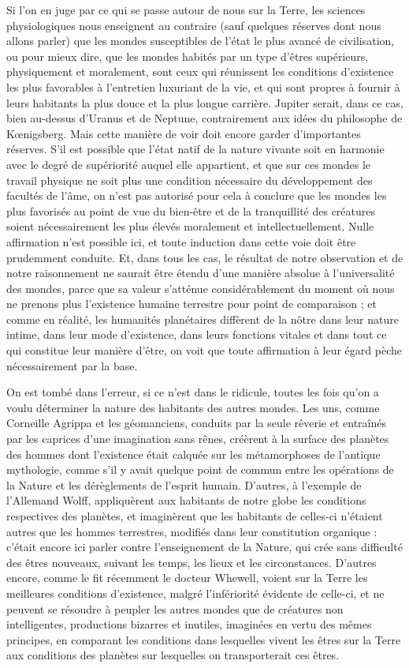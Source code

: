\documentclass[a4paper, 11pt, oneside, landscape]{article}
\begin{document}
Si l'on en juge par ce qui se passe autour de nous sur la Terre, les sciences physiologiques nous enseignent au contraire (sauf quelques réserves dont nous allons parler) que les mondes susceptibles de l'état le plus avancé de civilisation, ou pour mieux dire, que les mondes habités par un type d'êtres supérieurs, physiquement et moralement, sont ceux qui réunissent les conditions d'existence les plus favorables à l'entretien luxuriant de la vie, et qui sont propres à fournir à leurs habitants la plus douce et la plus longue carrière. Jupiter serait, dans ce cas, bien au-dessus d'Uranus et de Neptune, contrairement aux idées du philosophe de Kœnigsberg. Mais cette manière de voir doit encore garder d'importantes réserves. S'il est possible que l'état natif de la nature vivante soit en harmonie avec le degré de supériorité auquel elle appartient, et que sur ces mondes le travail physique ne soit plus une condition nécessaire du développement des facultés de l'âme, on n'est pas autorisé pour cela à conclure que les mondes les plus favorisés au point de vue du bien-être et de la tranquillité des créatures soient nécessairement les plus élevés moralement et intellectuellement. Nulle affirmation n'est possible ici, et toute induction dans cette voie doit être prudemment conduite. Et, dans tous les cas, le résultat de notre observation et de notre raisonnement ne saurait être étendu d'une manière absolue à l'universalité des mondes, parce que sa valeur s'atténue considérablement du moment où nous ne prenons plus l'existence humaine terrestre pour point de comparaison ; et comme en réalité, les humanités planétaires diffèrent de la nôtre dans leur nature intime, dans leur mode d'existence, dans leurs fonctions vitales et dans tout ce qui constitue leur manière d'être, on voit que toute affirmation à leur égard pèche nécessairement par la base.

On est tombé dans l'erreur, si ce n'est dans le ridicule, toutes les fois qu'on a voulu déterminer la nature des habitants des autres mondes. Les uns, comme Corneille Agrippa et les géomanciens, conduits par la seule rêverie et entraînés par les caprices d'une imagination sans rênes, créèrent à la surface des planètes des hommes dont l'existence était calquée sur les métamorphoses de l'antique mythologie, comme s'il y avait quelque point de commun entre les opérations de la Nature et les dérèglements de l'esprit humain. D'autres, à l'exemple de l'Allemand Wolff, appliquèrent aux habitants de notre globe les conditions respectives des planètes, et imaginèrent que les habitants de celles-ci n'étaient autres que les hommes terrestres, modifiés dans leur constitution organique : c'était encore ici parler contre l'enseignement de la Nature, qui crée sans difficulté des êtres nouveaux, suivant les temps, les lieux et les circonstances. D'autres encore, comme le fit récemment le docteur Whewell, voient sur la Terre les meilleures conditions d'existence, malgré l'infériorité évidente de celle-ci, et ne peuvent se résoudre à peupler les autres mondes que de créatures non intelligentes, productions bizarres et inutiles, imaginées en vertu des mêmes principes, en comparant les conditions dans lesquelles vivent les êtres sur la Terre aux conditions des planètes sur lesquelles on transporterait ces êtres.
\end{document}
